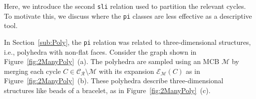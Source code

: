 \documentclass[fleqn,11pt]{article}
\newcommand\calM{\mathcal{M}}
\newcommand\RelCyc{\mathcal{C_R}} %
\newcommand\expand[2]{\mathcal{E}_{#1}\left(#2\right)}   %
\begin{document}








Here, we introduce the second {\tt sli} relation used to partition the relevant cycles.
To motivate this, we discuss where the {\tt pi} classes are less effective as a descriptive tool.

In Section~\ref{sub:Poly}, the {\tt pi} relation was related to three-dimensional structures, i.e., polyhedra with non-flat faces.
Consider the graph shown in Figure~\ref{fig:2ManyPoly}~(a). 
The polyhedra are sampled using an MCB $\calM$ by merging each cycle $C\in\RelCyc\setminus\calM$ with its expansion $\expand{\calM}{C}$ as in Figure~\ref{fig:2ManyPoly}~(b).
These polyhedra describe three-dimensional structures like beads of a bracelet, as in Figure~\ref{fig:2ManyPoly}~(c).
\end{document}
